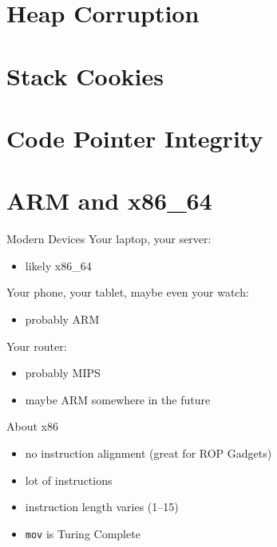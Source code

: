 \documentclass[beamer]{uibk}
\begin{document}
\section{Heap Corruption}

\section{Stack Cookies}

\section{Code Pointer Integrity}

\section{ARM and x86\_64}

\begin{frame}{Modern Devices}
    Your laptop, your server:
    \begin{itemize}
        \item likely x86\_64
    \end{itemize}
    \medskip
    \pause
    Your phone, your tablet, maybe even your watch:
    \begin{itemize}
        \item probably ARM
    \end{itemize}
    \medskip
    \pause
    Your router:
    \begin{itemize}
        \item probably MIPS
        \item maybe ARM somewhere in the future
    \end{itemize}
\end{frame}

\begin{frame}{About x86}
    \begin{itemize}
        \item no instruction alignment (great for ROP Gadgets)
        \item lot of instructions
        \item instruction length varies (\SIrange{1}{15}{\byte})
        \item \texttt{mov} is Turing Complete
    \end{itemize}
\end{frame}
\end{document}
